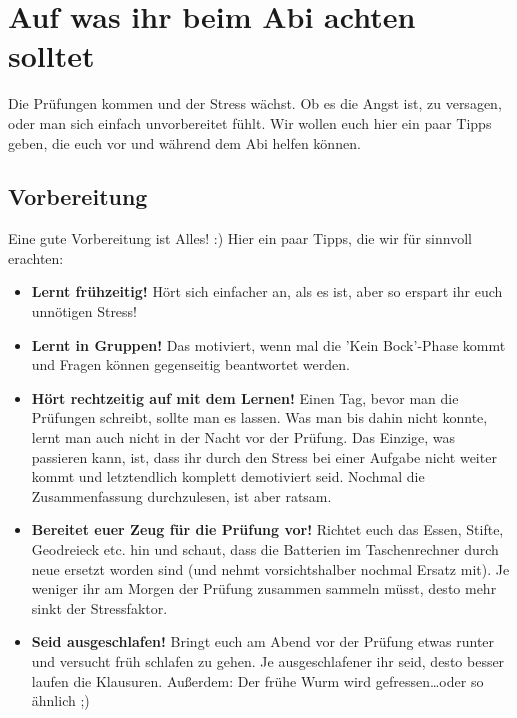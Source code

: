 \chapter{Auf was ihr beim Abi achten solltet}
	Die Prüfungen kommen und der Stress wächst. Ob es die Angst ist, zu versagen,
	oder man sich einfach unvorbereitet fühlt. Wir wollen euch hier ein paar Tipps
	geben, die euch vor und während dem Abi helfen können.
	
	\section{Vorbereitung}
		Eine gute Vorbereitung ist Alles! :) Hier ein paar Tipps, die wir für sinnvoll
		erachten:
		\begin{itemize}
		  \item \textbf{Lernt frühzeitig!} Hört sich einfacher an, als es ist, aber so
		  erspart ihr euch unnötigen Stress!
		  \item \textbf{Lernt in Gruppen!} Das motiviert, wenn mal die 'Kein
		  Bock'-Phase kommt und Fragen können gegenseitig beantwortet werden.
		  \item \textbf{Hört rechtzeitig auf mit dem Lernen!} Einen Tag, bevor
		  man die Prüfungen schreibt, sollte man es lassen. Was man bis dahin nicht
		  konnte, lernt man auch nicht in der Nacht vor der Prüfung. Das Einzige, was
		  passieren kann, ist, dass ihr durch den Stress bei einer Aufgabe nicht
		  weiter kommt und letztendlich komplett demotiviert seid. Nochmal die
		  Zusammenfassung durchzulesen, ist aber ratsam.
		  \item \textbf{Bereitet euer Zeug für die Prüfung vor!} Richtet euch das
		  Essen, Stifte, Geodreieck etc. hin und schaut, dass die Batterien im
		  Taschenrechner durch neue ersetzt worden sind (und nehmt vorsichtshalber
		  nochmal Ersatz mit).
		  Je weniger ihr am Morgen der Prüfung zusammen sammeln müsst, desto mehr sinkt der Stressfaktor.
		  \item \textbf{Seid ausgeschlafen!} Bringt euch am Abend vor der Prüfung
		  etwas runter und versucht früh schlafen zu gehen. Je ausgeschlafener ihr
		  seid, desto besser laufen die Klausuren. Außerdem: Der frühe Wurm wird
		  gefressen\ldots oder so ähnlich ;)
		\end{itemize}
		
